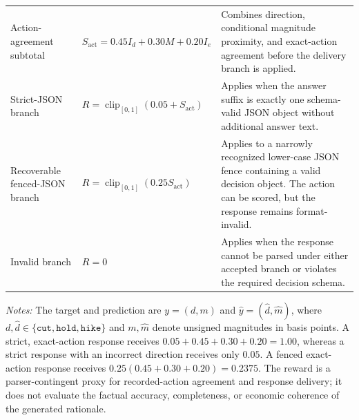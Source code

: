 \begin{table}[htbp]
\begin{threeparttable}
\begin{tabularx}{\textwidth}{@{}
        >{\raggedright\arraybackslash}p{}
        >{\centering\arraybackslash}p{}
        >{\raggedright\arraybackslash}X
    @{}}
        Action-agreement subtotal
        &
        \(
        S_{\mathrm{act}}
        =
        0.45I_d+0.30M+0.20I_e
        \)
        &
        Combines direction, conditional magnitude proximity, and exact-action
        agreement before the delivery branch is applied. \\

        Strict-JSON branch
        &
        \(
        R
        =
        \operatorname{clip}_{[0,1]}
        \left(0.05+S_{\mathrm{act}}\right)
        \)
        &
        Applies when the answer suffix is exactly one schema-valid JSON object
        without additional answer text. \\

        Recoverable fenced-JSON branch
        &
        \(
        R
        =
        \operatorname{clip}_{[0,1]}
        \left(0.25S_{\mathrm{act}}\right)
        \)
        &
        Applies to a narrowly recognized lower-case JSON fence containing a
        valid decision object. The action can be scored, but the response
        remains format-invalid. \\

        Invalid branch
        &
        \(R=0\)
        &
        Applies when the response cannot be parsed under either accepted
        branch or violates the required decision schema. \\

        \bottomrule
    \end{tabularx}

    \begin{tablenotes}[flushleft]
        \scriptsize
        \item \textit{Notes:}
        The target and prediction are \(y=(d,m)\) and
        \(\hat y=(\hat d,\hat m)\), where
        \(d,\hat d\in\{\texttt{cut},\texttt{hold},\texttt{hike}\}\) and
        \(m,\hat m\) denote unsigned magnitudes in basis points. A strict,
        exact-action response receives
        \(0.05+0.45+0.30+0.20=1.00\), whereas a strict response with an
        incorrect direction receives only \(0.05\). A fenced exact-action
        response receives \(0.25(0.45+0.30+0.20)=0.2375\).
        The reward is a parser-contingent proxy for recorded-action agreement
        and response delivery; it does not evaluate the factual accuracy,
        completeness, or economic coherence of the generated rationale.
    \end{tablenotes}
    \end{threeparttable}
\end{table}





